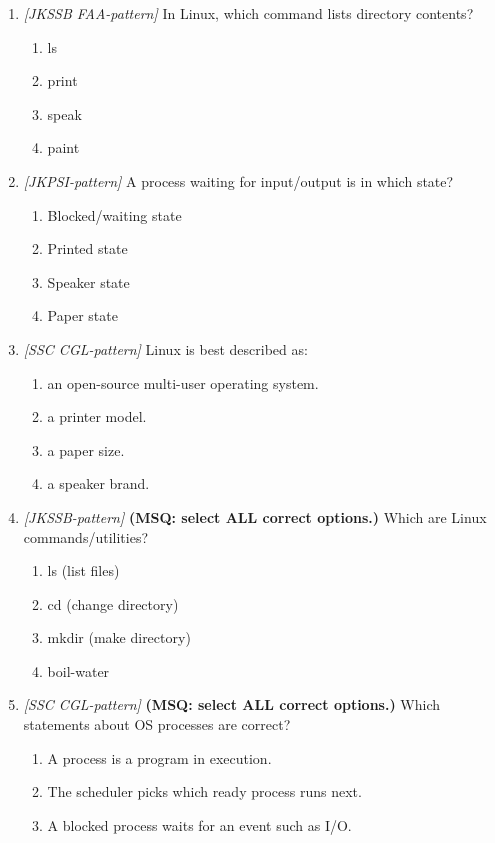 \begin{enumerate}[label=\textbf{Q\arabic*.}, leftmargin=*]
\item \textit{[JKSSB FAA-pattern]} In Linux, which command lists directory contents?
  \begin{enumerate}[label=\Alph*.]
    \item ls
    \item print
    \item speak
    \item paint
  \end{enumerate}
\item \textit{[JKPSI-pattern]} A process waiting for input/output is in which state?
  \begin{enumerate}[label=\Alph*.]
    \item Blocked/waiting state
    \item Printed state
    \item Speaker state
    \item Paper state
  \end{enumerate}
\item \textit{[SSC CGL-pattern]} Linux is best described as:
  \begin{enumerate}[label=\Alph*.]
    \item an open-source multi-user operating system.
    \item a printer model.
    \item a paper size.
    \item a speaker brand.
  \end{enumerate}
\item \textit{[JKSSB-pattern]} \textbf{(MSQ: select ALL correct options.)} Which are Linux commands/utilities?
  \begin{enumerate}[label=\Alph*.]
    \item ls (list files)
    \item cd (change directory)
    \item mkdir (make directory)
    \item boil-water
  \end{enumerate}
\item \textit{[SSC CGL-pattern]} \textbf{(MSQ: select ALL correct options.)} Which statements about OS processes are correct?
  \begin{enumerate}[label=\Alph*.]
    \item A process is a program in execution.
    \item The scheduler picks which ready process runs next.
    \item A blocked process waits for an event such as I/O.

\end{enumerate}
\end{enumerate}
